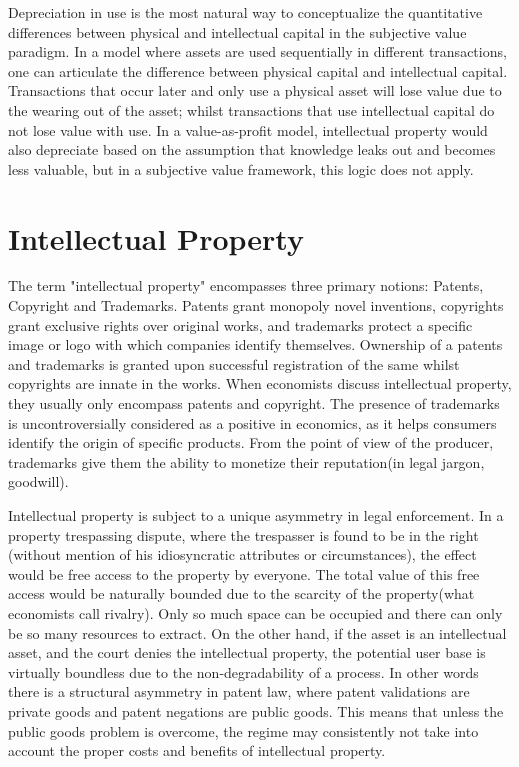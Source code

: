 Depreciation in use is the most natural way to conceptualize the quantitative differences between physical and intellectual capital in the subjective value paradigm. In a model where assets are used sequentially in different transactions, one can articulate the difference between physical capital and intellectual capital. Transactions that occur later and only use a physical asset will lose value due to the wearing out of the asset; whilst transactions that use intellectual capital do not lose value with use. In a value-as-profit model, intellectual property would also depreciate based on the assumption that knowledge leaks out and becomes less valuable, but in a subjective value framework, this logic does not apply.

\section{Intellectual Property}\label{intellectual}

The term "intellectual property" encompasses three primary notions: Patents, Copyright and Trademarks. Patents grant monopoly novel inventions, copyrights grant exclusive rights over original works, and trademarks protect a specific image or logo with which companies identify themselves. Ownership of a patents and trademarks is granted upon successful registration of the same whilst copyrights are innate in the works. When economists discuss intellectual property, they usually only encompass patents and copyright. The presence of trademarks is uncontroversially considered as a positive in economics, as it helps consumers identify the origin of specific products. From the point of view of the producer, trademarks give them the ability to monetize their reputation(in legal jargon, goodwill). 


Intellectual property is subject to a unique asymmetry in legal enforcement. In a property trespassing dispute, where the trespasser is found to be in the right (without mention of his idiosyncratic attributes or circumstances), the effect would be free access to the property by everyone. The total value of this free access would be naturally bounded due to the scarcity of the property(what economists call rivalry). Only so much space can be occupied and there can only be so many resources to extract. On the other hand, if the asset is an intellectual asset, and the court denies the intellectual property, the potential user base is virtually boundless due to the non-degradability of a process. In other words there is a structural asymmetry in patent law, where patent validations are private goods and patent negations are public goods. This means that unless the public goods problem is overcome, the regime may consistently not take into account the proper costs and benefits of intellectual property.

